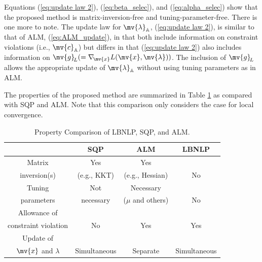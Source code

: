\documentclass[journal]{IEEEtranTIE}
\begin{document}
Equations (\ref{eq:update law 2}), (\ref{eq:beta_selec}), and (\ref{eq:alpha_selec}) show that the proposed method is matrix-inversion-free and tuning-parameter-free. There is one more to note. 
The update law for $\mv{\lambda}_{\mathbb{A}}$, (\ref{eq:update law 2}), is similar to that of ALM, (\ref{eq:ALM_update}), in that both include information on constraint violations (i.e., ${\mv{c}_{\mathbb{A}}}$) but differs in that (\ref{eq:update law 2}) also includes information on $\mv{g}_{\! L}(= \nabla_{\!\mv{x}}L(\mv{x},\mv{\lambda}))$. The inclusion of $\mv{g}_{\! L}$ allows the appropriate update of $\mv{\lambda}_{\mathbb{A}}$ without using tuning parameters as in ALM. 

The properties of the proposed method are summarized in Table \ref{tab:Comparison of LBNLP, SQP and ALM} as compared with SQP and ALM. Note that this comparison only considers the case for local convergence.

\begin{table}[!t]
\caption{Property Comparison of LBNLP, SQP, and ALM.}
\label{tab:Comparison of LBNLP, SQP and ALM}
\centering
{\begin{tabular}{cccc}\hline
  & SQP & ALM & LBNLP \\
\hline\hline
\rowcolor{lightgray} 
Matrix  & Yes & Yes & \\
\rowcolor{lightgray}
inversion(s) & (e.g., KKT) & (e.g., Hessian) & \multirow{-2}{*}{No}\\
Tuning & Not & Necessary & \\
parameters & necessary & ($\mu$ and others) & \multirow{-2}{*}{No}\\
\rowcolor{lightgray}
Allowance of &  &  & \\
\rowcolor{lightgray}
constraint violation & \multirow{-2}{*}{No} & \multirow{-2}{*}{Yes} & \multirow{-2}{*}{Yes}\\
Update of & & &\\
$\mv{x}$ and $\lambda$  & \multirow{-2}{*}{Simultaneous} & \multirow{-2}{*}{Separate} & \multirow{-2}{*}{Simultaneous}\\
\hline
\end{tabular}}
\end{table}
\end{document}
